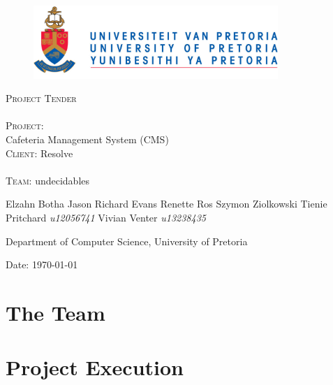 \documentclass[12pt]{article}
\begin{document}
\begin{titlepage}
	\begin{center}
		
		\begin{figure}[t]
			\centering
			\includegraphics[width=350px]{UP_Logo.png}
		\end{figure}
		
		\textsc{\Huge Project Tender} \\ 

		\textsc{\huge \\Project:\\	}
		\huge Cafeteria Management System (CMS) 
		\textsc{\Large \\Client:}
		\large Resolve \\

		\textsc{\huge \\ Team:}
		\huge \textsc{}undecidables\textsc{}
		\begin{flushright} \large
			Elzahn Botha 		\emph{} \newline
			Jason Richard Evans	\emph{} \newline
			Renette Ros			\emph{} \newline
			Szymon Ziolkowski	\emph{} \newline
			Tienie Pritchard 	\emph{u12056741} \newline
			Vivian Venter 		\emph{u13238435} \newline
		\end{flushright}
		\small Department of Computer Science, University of Pretoria \\

	\vfill

	{\large Date: \today}		
		
		
	\end{center}
\end{titlepage}

\newpage
\tableofcontents

\pagebreak

\section{The Team}


\section{Project Execution}

\end{document}
